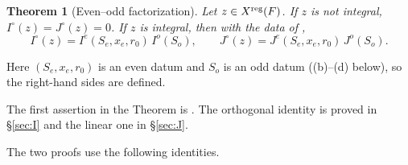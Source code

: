 \documentclass[11pt,oneside,notitlepage]{book}
\numberwithin{equation}{section}
\theoremstyle{plain}
\newtheorem{theorem}{Theorem}[section]
\theoremstyle{definition}
\begin{document}
\begin{theorem}[Even--odd factorization]\label{thm:factorization}
Let $z\in X^{\rm reg}(F)$. If $z$ is not integral, $I^\circ(z)=J^\circ(z)=0$. If $z$ is integral, then with the data of ,
\[I^\circ(z)=I^e(S_e,x_e,r_0)\,I^o(S_o),\qquad J^\circ(z)=J^e(S_e,x_e,r_0)\,J^o(S_o).\]
\end{theorem}

Here $(S_e,x_e,r_0)$ is an even datum and $S_o$ is an odd datum ((b)--(d) below), so the right-hand sides are defined.

The first assertion in the Theorem is . The orthogonal identity is proved in \S\ref{sec:I} and the linear one in \S\ref{sec:J}.

The two proofs use the following identities.
\end{document}

